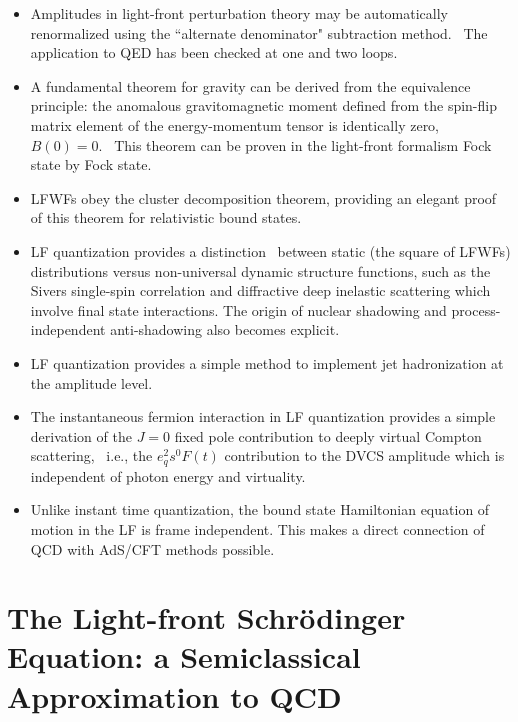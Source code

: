 \documentclass[prd,aps,onecolumn,nofootinbib]{revtex4}
\begin{document}
\begin{itemize}
\item
Amplitudes in light-front perturbation theory may be automatically renormalized using the ``alternate denominator"  subtraction method.~\cite{Brodsky:1973kb} The application to QED has been checked at one and two loops.~\cite{Brodsky:1973kb}

\item
A fundamental theorem for gravity can be derived from the equivalence principle:  the anomalous gravitomagnetic moment defined from the spin-flip  matrix element of the energy-momentum tensor is identically zero, $B(0)=0$.~\cite{Teryaev:1999su} This theorem can be proven in  the light-front formalism Fock state by Fock state.~\cite{Brodsky:2000ii} 

\item
LFWFs obey the cluster decomposition theorem, providing an elegant proof of this theorem for relativistic bound states.~\cite{Brodsky:1985gs}


\item
LF quantization provides a distinction~\cite{Brodsky:2009dv} between static  (the square of LFWFs) distributions versus non-universal dynamic structure functions,  such as the Sivers single-spin correlation and diffractive deep inelastic scattering which involve final state interactions.  The origin of nuclear shadowing and process-independent anti-shadowing also becomes explicit.~\cite{Brodsky:2004qa}


\item
LF quantization provides a simple method to implement jet hadronization at the amplitude level.~\cite{Brodsky:2008tk}

\item
The instantaneous fermion interaction in LF  quantization provides a simple derivation of the $J=0$
fixed pole contribution to deeply virtual Compton scattering,~\cite{Brodsky:2009bp} i.e., the $e^2_q s^0 F(t)$  contribution to the DVCS amplitude which is independent of photon energy and virtuality.

\item
Unlike instant time quantization, the bound state
Hamiltonian equation of motion in the LF is frame independent. This makes a direct connection of QCD with AdS/CFT methods possible.~\cite{deTeramond:2008ht}



\end{itemize}

\section{The Light-front Schr\"odinger Equation: a Semiclassical Approximation to QCD \label{LFQCD}}
\end{document}
